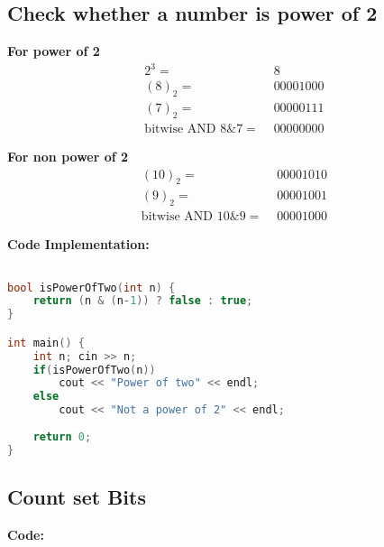 \subsection{Check whether a number is power of 2}
\setlength{\columnsep}{3cm}
\begin{multicols}{2}
\begin{center}
\textbf{For power of 2}
\begin{align*}
	2^3 =&\hspace{4pt} 8\\
	(8)_2 =&\hspace{4pt} 00001000\\
	(7)_2 =&\hspace{4pt} 00000111\\
	\hline
	\text{bitwise AND}\hspace{4pt} 8 \& 7 =&\hspace{4pt} 00000000
\end{align*}
\end{center}

\columnbreak

\begin{center}
\textbf{For non power of 2}
\begin{align*}
	(10)_2 =&\hspace{4pt} 00001010\\
	(9)_2 =&\hspace{4pt} 00001001\\
	\hline
	\text{bitwise AND $10 \& 9$} =&\hspace{4pt} 00001000
\end{align*}
\end{center}

\end{multicols}

\textbf{Code Implementation:}
\begin{lstlisting}[language=c++]

bool isPowerOfTwo(int n) {
    return (n & (n-1)) ? false : true;
}

int main() {
    int n; cin >> n;
    if(isPowerOfTwo(n))
        cout << "Power of two" << endl;
    else
        cout << "Not a power of 2" << endl;
    
    return 0;
}
\end{lstlisting}


\subsection{Count set Bits}
\textbf{Code:}

